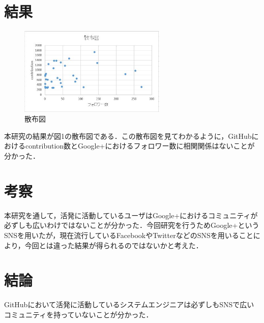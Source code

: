 \documentclass[uplatex,twocolumn,dvipdfmx]{jsarticle}
\begin{document}
\section{結果}

\begin{figure}[htb]
\centering
\includegraphics[width=7cm]{sanpu.jpg}
\caption{散布図}\label{サンプル図}
\end{figure}
本研究の結果が図1の散布図である．この散布図を見てわかるように，GitHubにおけるcontribution数とGoogle+におけるフォロワー数に相関関係はないことが分かった．

\section{考察}

本研究を通して，活発に活動しているユーザはGoogle+におけるコミュニティが必ずしも広いわけではないことが分かった．今回研究を行うためGoogle+というSNSを用いたが，現在流行しているFacebookやTwitterなどのSNSを用いることにより，今回とは違った結果が得られるのではないかと考えた．

\section{結論}

GitHubにおいて活発に活動しているシステムエンジニアは必ずしもSNSで広いコミュニティを持っていないことが分かった．




\end{document}
